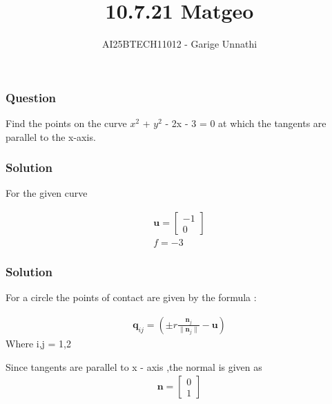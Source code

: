 \documentclass{beamer}
\title{10.7.21 Matgeo}
\author{AI25BTECH11012 - Garige Unnathi}
\date{}
\begin{document}
\frame{\titlepage}

\begin{frame}
\frametitle{Question}
Find the points on the curve $x^2$ + $y^2$ - 2x - 3 = 0 at which the tangents are parallel
to the x-axis.
\end{frame}


\begin{frame}
\frametitle{Solution}
For the given curve 

\begin{align}
    \textbf{u} = \begin{bmatrix}-1\\0\end{bmatrix}\\
    f = -3
\end{align}


\end{frame}
\begin{frame}
\frametitle{Solution}
For a circle the points of contact are given by the formula :

\begin{align}
\textbf{q}_{ij} = \left (\pm r \frac{\textbf{n}_j}{{\lVert\textbf{n}_j\rVert}} - \textbf{u}\right)
\end{align}
Where i,j = 1,2

Since tangents are parallel to x - axis ,the normal is given as 
\begin{align}
  \textbf{n} =\begin{bmatrix} 0\\1\end{bmatrix}
\end{align}

\end{frame}
\end{document}
